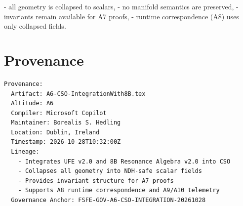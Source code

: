 \documentclass[11pt]{article}
\begin{document}
- all geometry is collapsed to scalars,
- no manifold semantics are preserved,
- invariants remain available for A7 proofs,
- runtime correspondence (A8) uses only collapsed fields.

\newpage


\section*{Provenance}

\begin{verbatim}
Provenance:
  Artifact: A6-CSO-IntegrationWith8B.tex
  Altitude: A6
  Compiler: Microsoft Copilot
  Maintainer: Borealis S. Hedling
  Location: Dublin, Ireland
  Timestamp: 2026-10-28T10:32:00Z
  Lineage:
    - Integrates UFE v2.0 and 8B Resonance Algebra v2.0 into CSO
    - Collapses all geometry into NDH-safe scalar fields
    - Provides invariant structure for A7 proofs
    - Supports A8 runtime correspondence and A9/A10 telemetry
  Governance Anchor: FSFE-GOV-A6-CSO-INTEGRATION-20261028
\end{verbatim}
\end{document}
